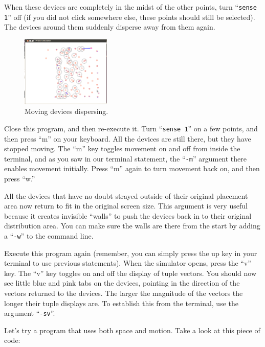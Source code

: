 \documentclass{article}
\newcommand\qvar[1]{``{\tt #1}''}
\begin{document}
When these devices are completely in the midst of the other points,
turn \qvar{sense 1} off (if you did not click somewhere else, these
points should still be selected).  The devices around them suddenly
disperse away from them again.

\begin{figure}
  \includegraphics[width=0.38\textwidth]{figures/motion.png}
  \caption{Moving devices dispersing.}
  \vspace{-0.5cm}
  \label{f:motion}
\end{figure}

Close this program, and then re-execute it.  Turn \qvar{sense 1} on a
few points, and then press ``m'' on your keyboard.  All the devices
are still there, but they have stopped moving.  The ``m'' key toggles
movement on and off from inside the terminal, and as you saw in our
terminal statement, the \qvar{-m} argument there enables movement
initially.  Press ``m'' again to turn movement back on, and then press
``w.''

All the devices that have no doubt strayed outside of their original
placement area now return to fit in the original screen size.  This
argument is very useful because it creates invisible ``walls'' to push
the devices back in to their original distribution area.  You can make
sure the walls are there from the start by adding a \qvar{-w} to the
command line.

Execute this program again (remember, you can simply press the up key
in your terminal to use previous statements).  When the simulator
opens, press the ``v'' key.  The ``v'' key toggles on and off the
display of tuple vectors.  You should now see little blue and pink
tabs on the devices, pointing in the direction of the vectors returned
to the devices.  The larger the magnitude of the vectors the longer
their tuple displays are.  To establish this from the terminal, use
the argument \qvar{-sv}.

Let's try a program that uses both space and motion. Take a look at
this piece of code:
\end{document}
